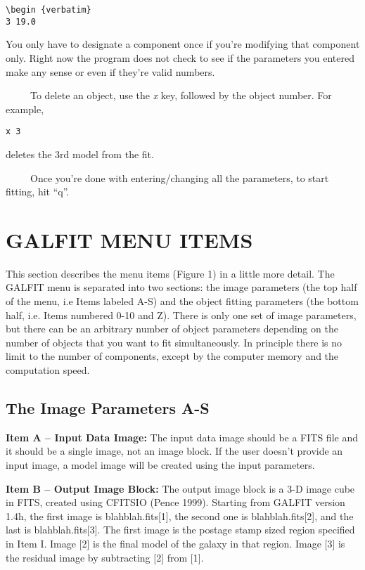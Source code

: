 \documentclass[preprint]{aastex}
\begin{document}
\begin {verbatim}
\begin {verbatim}
3 19.0     
\end {verbatim}

You only have to designate a component once if you're modifying that
component only.  Right now the program does not check to see if the 
parameters you entered make any sense or even if they're valid numbers.

\bigskip

\ \ \ \ \  To delete an object, use the 
{\it x} key, followed by the object number.  For example, 

\begin{verbatim}
x 3
\end{verbatim}

\noindent deletes the 3rd model from the fit.

\bigskip

\ \ \ \ \ Once you're done with entering/changing 
all the parameters, to start fitting, hit ``q''.


\section {GALFIT MENU ITEMS}

This section describes the menu items (Figure 1) in a little more detail.  The
GALFIT menu is separated into two sections:  the image parameters (the top
half of the menu, i.e Items labeled A-S) and the object fitting parameters
(the bottom half, i.e. Items numbered 0-10 and Z).  There is only one set of
image parameters, but there can be an arbitrary number of object parameters
depending on the number of objects that you want to fit simultaneously.  In
principle there is no limit to the number of components, except by the
computer memory and the computation speed.

\subsection {The Image Parameters A-S}

{\bf Item A -- Input Data Image:} The input data image should be a FITS file
	 and it should be a single image, not an image block.  If the user
	 doesn't provide an input image, a model image will be created using
	 the input parameters.

\smallskip

{\bf Item B -- Output Image Block:} The output image block is a 3-D image cube
	 in FITS, created using CFITSIO (Pence 1999).  Starting from GALFIT
	 version 1.4h, the first image is blahblah.fits[1], the second one is
	 blahblah.fits[2], and the last is blahblah.fits[3].  The first image
	 is the postage stamp sized region specified in Item I.  Image [2] is
	 the final model of the galaxy in that region.  Image [3] is the
	 residual image by subtracting [2] from [1].
\end{document}
